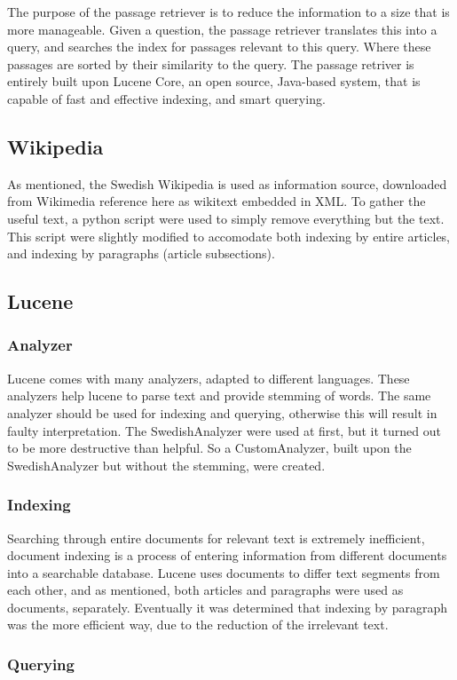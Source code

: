 The purpose of the passage retriever is to reduce the information to a size that is more manageable.
Given a question, the passage retriever translates this into a query, and searches the index for passages 
relevant to this query. Where these passages are sorted by their similarity to the query.
The passage retriver is entirely built upon Lucene Core, an open source, Java-based system, 
that is capable of fast and effective indexing, and smart querying.

\subsection{Wikipedia}
As mentioned, the Swedish Wikipedia is used as information source, downloaded from Wikimedia {reference here} as wikitext embedded in XML.
To gather the useful text, a python script were used to simply remove everything but the text. 
This script were slightly modified to accomodate both indexing by entire articles, and indexing by paragraphs (article subsections).

\subsection{Lucene}

\subsubsection{Analyzer}
Lucene comes with many analyzers, adapted to different languages. 
These analyzers help lucene to parse text and provide stemming of words.
The same analyzer should be used for indexing and querying, otherwise this will result in faulty interpretation.
The SwedishAnalyzer were used at first, but it turned out to be more destructive than helpful. 
So a CustomAnalyzer, built upon the SwedishAnalyzer but without the stemming, were created.

\subsubsection{Indexing}
Searching through entire documents for relevant text is extremely inefficient, 
document indexing is a process of entering information from different documents into a searchable database. 
Lucene uses documents to differ text segments from each other, and as mentioned, both articles and paragraphs were used as documents, separately.
Eventually it was determined that indexing by paragraph was the more efficient way, due to the reduction of the irrelevant text.

\subsubsection{Querying}

